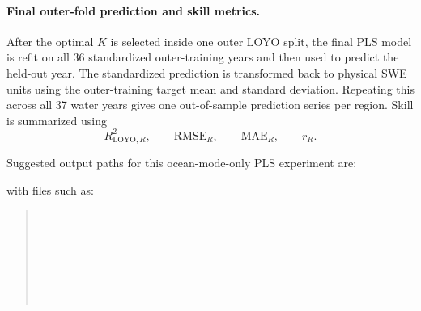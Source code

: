 \documentclass[11pt]{article}
\begin{document}
\paragraph{Final outer-fold prediction and skill metrics.}
After the optimal $K$ is selected inside one outer LOYO split, the final PLS model is refit on all
36 standardized outer-training years and then used to predict the held-out year. The standardized
prediction is transformed back to physical SWE units using the outer-training target mean and
standard deviation. Repeating this across all 37 water years gives one out-of-sample prediction
series per region. Skill is summarized using
\[
R^2_{\mathrm{LOYO},R},\qquad \mathrm{RMSE}_R,\qquad \mathrm{MAE}_R,\qquad r_R.
\]

Suggested output paths for this ocean-mode-only PLS experiment are:
\begin{quote}
\end{quote}
with files such as:
\begin{quote}
\\
\\
\\
\\
\\
\\
\end{quote}
\end{document}
